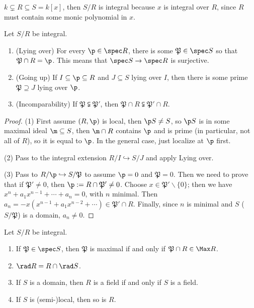  \begin{example}
   $k\subsetneq R\subseteq S=k[x]$, then $S/R$ is integral because $x$ is integral over
   $R$, since $R$ must contain some monic polynomial in $x$.
 \end{example}
 \begin{theorem}[Going Up]
   Let $S/R$ be integral.
   \begin{enumerate}
     \item (Lying over) For every $\p\in \spec R$, there is some $\mathfrak{P}\in \spec
     S$ so that $\mathfrak{P}\cap R=\p$. This means that $\spec S\to \spec R$ is
     surjective.

     \item (Going up) If $I\subseteq \p\subseteq R$ and $J\subseteq S$ lying over $I$,
     then there is some prime $\mathfrak{P}\supseteq J$ lying over $\p$.

     \item (Incomparability) If $\mathfrak{P}\subsetneqq \mathfrak{P}'$, then $\mathfrak{P}\cap R\subsetneqq
     \mathfrak{P}'\cap R$.
   \end{enumerate}
 \end{theorem}
 \begin{proof}
   (1) First assume $(R,\p)$ is local, then $\p S\neq S$, so $\p S$ is in some maximal
   ideal $\m\subseteq S$, then $\m\cap R$ contains $\p$ and is prime (in particular, not
   all of $R$), so it is equal to $\p$. In the general case, just localize at $\p$ first.

   (2) Pass to the integral extension $R/I\hookrightarrow S/J$ and apply Lying over.

   (3) Pass to $R/\p\hookrightarrow S/\mathfrak{P}$ to assume $\p=0$ and $\mathfrak{P}=0$.
   Then we need to prove that if $\mathfrak{P}'\neq 0$, then $\p:=R\cap \mathfrak{P}'\neq
   0$. Choose $x\in \mathfrak{P}'\smallsetminus \{0\}$; then we have
   $x^n+a_1x^{n-1}+\cdots + a_n=0$, with $n$ minimal. Then
   $a_n=-x(x^{n-1}+a_1x^{n-2}+\cdots )\in \mathfrak{P}'\cap R$. Finally, since $n$ is
   minimal and $S$ ($S/\mathfrak{P}$) is a domain, $a_n\neq 0$.
 \end{proof}
 \begin{corollary}
   Let $S/R$ be integral.
   \begin{enumerate}
     \item If $\mathfrak{P}\in \spec S$, then $\mathfrak{P}$ is maximal if and only if
     $\mathfrak{P}\cap R\in \Max R$.

     \item $\rad R = R\cap \rad S $.

     \item If $S$ is a domain, then $R$ is a field if and only if $S$ is a field.

     \item If $S$ is (semi-)local, then so is $R$.
   \end{enumerate}
 \end{corollary}
